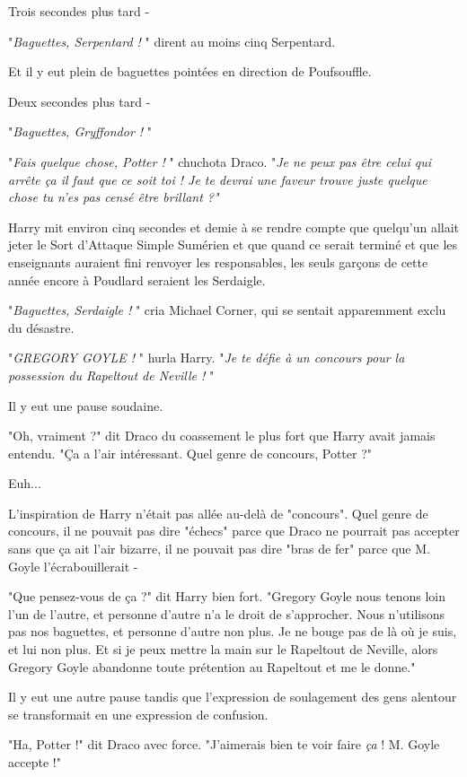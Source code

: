 Trois secondes plus tard -

"\emph{Baguettes, Serpentard !} " dirent au moins cinq Serpentard.

Et il y eut plein de baguettes pointées en direction de Poufsouffle.

Deux secondes plus tard -

"\emph{Baguettes, Gryffondor !} "

"\emph{Fais quelque chose, Potter !} " chuchota Draco. "\emph{Je ne peux pas être celui qui arrête ça il faut que ce soit toi ! Je te devrai une faveur trouve juste quelque chose tu n'es pas censé être brillant ?"} 

Harry mit environ cinq secondes et demie à se rendre compte que quelqu'un allait jeter le Sort d'Attaque Simple Sumérien et que quand ce serait terminé et que les enseignants auraient fini renvoyer les responsables, les seuls garçons de cette année encore à Poudlard seraient les Serdaigle.

"\emph{Baguettes, Serdaigle !} " cria Michael Corner, qui se sentait apparemment exclu du désastre.

"\emph{GREGORY GOYLE !} " hurla Harry. "\emph{Je te défie à un concours pour la possession du Rapeltout de Neville !} "

Il y eut une pause soudaine.

"Oh, vraiment ?" dit Draco du coassement le plus fort que Harry avait jamais entendu. "Ça a l'air intéressant. Quel genre de concours, Potter ?"

Euh...

L'inspiration de Harry n'était pas allée au-delà de "concours". Quel genre de concours, il ne pouvait pas dire "échecs" parce que Draco ne pourrait pas accepter sans que ça ait l'air bizarre, il ne pouvait pas dire "bras de fer" parce que M. Goyle l'écrabouillerait -

"Que pensez-vous de ça ?" dit Harry bien fort. "Gregory Goyle nous tenons loin l'un de l'autre, et personne d'autre n'a le droit de s'approcher. Nous n'utilisons pas nos baguettes, et personne d'autre non plus. Je ne bouge pas de là où je suis, et lui non plus. Et si je peux mettre la main sur le Rapeltout de Neville, alors Gregory Goyle abandonne toute prétention au Rapeltout et me le donne."

Il y eut une autre pause tandis que l'expression de soulagement des gens alentour se transformait en une expression de confusion.

"Ha, Potter !" dit Draco avec force. "J'aimerais bien te voir faire \emph{ça}  ! M. Goyle accepte !"


